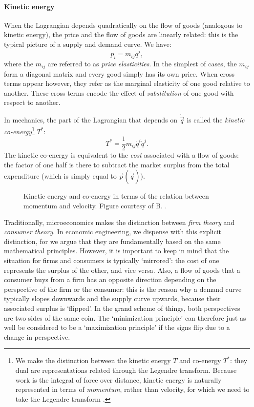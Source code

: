 \paragraph{Kinetic energy} When the Lagrangian depends quadratically on the flow of goods (analogous to kinetic energy), the price and the flow of goods are linearly related: this is the typical picture of a supply and demand curve. We have:
$$ p_i = m_{ij} \dot{q}^j, $$
where the $m_{ij}$ are referred to as \emph{price elasticities}. In the simplest of cases, the $m_{ij}$ form a diagonal matrix and every good simply has its own price. When cross terms appear however, they refer as the marginal elasticity of one good relative to another. These cross terms encode the effect of \emph{substitution} of one good with respect to another. 

In mechanics, the part of the Lagrangian that depends on $\dot{\vec{q}}$ is called the \emph{kinetic co-energy}\footnote{We make the distinction between the kinetic energy $T$ and co-energy $T^*$: they dual are representations related through the Legendre transform. Because work is the integral of force over distance, kinetic energy is naturally represented in terms of \emph{momentum}, rather than velocity, for which we need to take the Legendre transform \cite{Jeltsema2009}.} $T^*$:
\begin{equation}
    T^* = \frac{1}{2}m_{ij}\dot{q}^i \dot{q}^j.
\end{equation} 
The kinetic co-energy is equivalent to the \emph{cost} associated with a flow of goods: the factor of one half is there to subtract the market surplus from the total expenditure (which is simply equal to $\vec{p}(\dot{\vec{q}})$).

\begin{figure}
    \centering
    
    \caption{Kinetic energy and co-energy in terms of the relation between momentum and velocity. Figure courtesy of B. \citet{Krabbenborg2021}.}
    \label{fig:kinetic_energy}
\end{figure}

Traditionally, microeconomics makes the distinction between \emph{firm theory} and \emph{consumer theory}. In economic engineering, we dispense with this explicit distinction, for we argue that they are fundamentally based on the same mathematical principles. However, it is important to keep in mind that the situation for firms and consumers is typically `mirrored': the cost of one represents the surplus of the other, and vice versa. Also, a flow of goods that a consumer buys from a firm has an opposite direction depending on the perspective of the firm or the consumer: this is the reason why a demand curve typically slopes downwards and the supply curve upwards, because their associated surplus is `flipped'. In the grand scheme of things, both perspectives are two sides of the same coin. The `minimization principle' can therefore just as well be considered to be a `maximization principle' if the signs flip due to a change in perspective.

